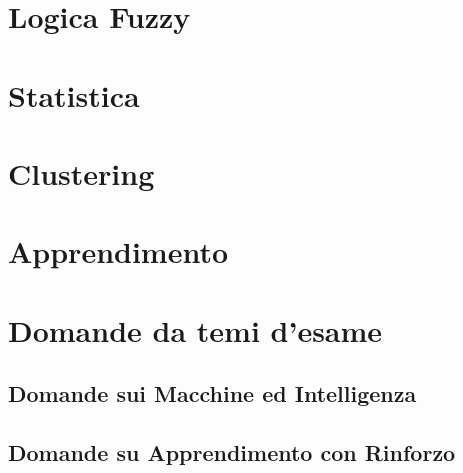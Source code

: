 \providecommand{\main}{.}


\newcommand{\graffe}[1]{\left\lbrace #1 \right\rbrace}

\setcounter{tocdepth}{2}






{\hypersetup{hidelinks}
  \tableofcontents  %
}

\chapter{Logica Fuzzy}


\chapter{Statistica}


\chapter{Clustering}


\chapter{Apprendimento}


\appendix
\chapter{Domande da temi d'esame}

\section{Domande sui Macchine ed Intelligenza}

\clearpage

\clearpage
\section{Domande su Apprendimento con Rinforzo}


